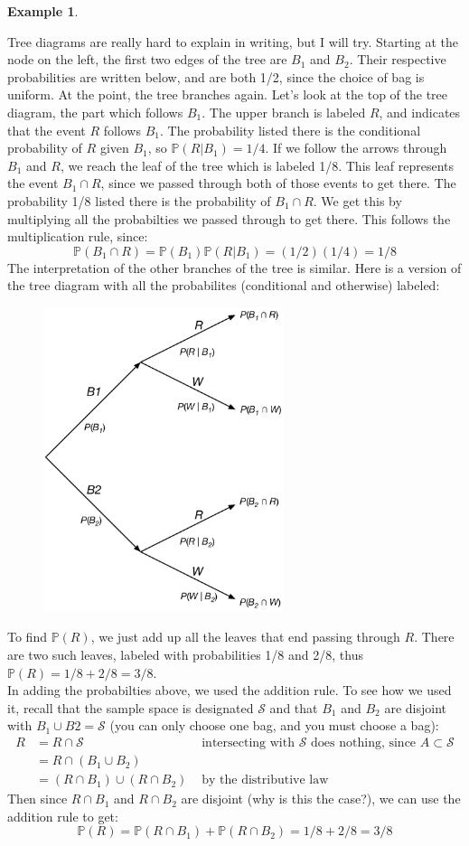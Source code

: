 \documentclass[12pt]{article}
\theoremstyle{definition}
\newtheorem*{example}{Example}
\theoremstyle{remark}
\def\P{{\mathbb P}}
\def\cals{{\mathcal S}}
\begin{document}
\begin{example}
\begin{enumerate}
Tree diagrams are really hard to explain in writing, but I will try. Starting at the node on the left, the first two edges of the tree are $B_1$ and $B_2$. Their respective probabilities are written below, and are both 1/2, since the choice of bag is uniform. At the point, the tree branches again. Let's look at the top of the tree diagram, the part which follows $B_1$. The upper branch is labeled $R$, and indicates that the event $R$ follows $B_1$. The probability listed there is the conditional probability of $R$ given $B_1$, so $\P(R|B_1) = 1/4$. If we follow the arrows through $B_1$ and $R$, we reach the leaf of the tree which is labeled 1/8. This leaf represents the event $B_1 \cap R$, since we passed through both of those events to get there. The probability 1/8 listed there is the probability of $B_1 \cap R$. We get this by multiplying all the probabilties we passed through to get there. This follows the multiplication rule, since:
\[
\P(B_1 \cap R) = \P(B_1)\P(R|B_1) = (1/2)(1/4) = 1/8
\]
The interpretation of the other branches of the tree is similar. Here is a version of the tree diagram with all the probabilites (conditional and otherwise) labeled: 
\begin{figure}[H]
\centering
\includegraphics[width=7cm]{tree2.eps}
\end{figure}

To find $\P(R)$, we just add up all the leaves that end passing through $R$. There are two such leaves, labeled with probabilities 1/8 and 2/8, thus $\P(R) = 1/8 + 2/8 = 3/8$.\\

In adding the probabilties above, we used the addition rule. To see how we used it, recall that the sample space is designated $\cals$ and that $B_1$ and $B_2$ are disjoint with $B_1 \cup B2 = \cals$ (you can only choose one bag, and you must choose a bag):
\begin{align*}
R &= R \cap \cals & \text{ intersecting with $\cals$ does nothing, since $A \subset \cals$}\\
&= R \cap (B_1 \cup B_2) \\
&= (R \cap B_1) \cup (R \cap B_2) & \text{ by the distributive law}
\end{align*}
Then since $R \cap B_1$ and $R \cap B_2$ are disjoint (why is this the case?), we can use the addition rule to get:
\[
\P(R) = \P(R \cap B_1) + \P(R \cap B_2) = 1/8 + 2/8 = 3/8
\]


\end{enumerate}
\end{example}
\end{document}
